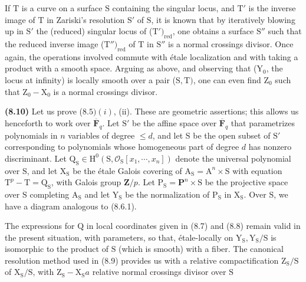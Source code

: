 \documentclass[10pt,leqno]{article}
\begin{document}
\clearpage

\label{physical-34}\par\smallskip

\noindent If \(\mathrm{T}\) is a curve on a surface \(\mathrm{S}\) containing the singular locus, and \(\mathrm{T}'\) is the inverse image of \(\mathrm{T}\) in Zariski’s resolution \(\mathrm{S}'\) of \(\mathrm{S}\), it is known that by iteratively blowing up in \(\mathrm{S}'\) the (reduced) singular locus of (\(\mathrm{T}')_{\mathrm{red}}\), one obtains a surface \(\mathrm{S}''\) such that the reduced inverse image (\(\mathrm{T}'')_{\mathrm{red}}\) of \(\mathrm{T}\) in \(\mathrm{S}''\) is a normal crossings divisor. Once again, the operations involved commute with étale localization and with taking a product with a smooth space. Arguing as above, and observing that (\(\mathrm{Y}_{0}\), the locus at infinity) is locally smooth over a pair (\(\mathrm{S},\mathrm{T})\), one can even find \(\mathrm{Z}_{0}\) such that \(\mathrm{Z}_{0}-\mathrm{X}_{0}\) is a normal crossings divisor.\par

\noindent \textbf{(8.10)} Let us prove (\(8.5) (i)\), (ii). These are geometric assertions; this allows us henceforth to work over \(\overline{\mathbf{F}}_{q}\). Let \(\mathrm{S}'\) be the affine space over \(\overline{\mathbf{F}}_{q}\) that parametrizes polynomials in \(n\) variables of degree \(\leq  d\), and let \(\mathrm{S}\) be the open subset of \(\mathrm{S}'\) corresponding to polynomials whose homogeneous part of degree \(d\) has nonzero discriminant. Let \(\mathrm{Q}_{\mathrm{S}} \in  \mathrm{H}^{0}(\mathrm{S},\mathcal{O}_{\mathrm{S}}[x_{1},\cdots ,x_{n}])\) denote the universal polynomial over \(\mathrm{S}\), and let \(\mathrm{X}_{\mathrm{S}}\) be the étale Galois covering of \(\mathrm{A}_{\mathrm{S}} = \mathrm{A}^{n} \times  \mathrm{S}\) with equation \(\mathrm{T}^{p}-\mathrm{T} = \mathrm{Q}_{\mathrm{S}}\), with Galois group \(\mathbf{Z}/p\). Let \(\mathrm{P}_{\mathrm{S}} = \mathbf{P}^{n} \times  \mathrm{S}\) be the projective space over \(\mathrm{S}\) completing \(\mathrm{A}_{\mathrm{S}}\) and let \(\mathrm{Y}_{\mathrm{S}}\) be the normalization of \(\mathrm{P}_{\mathrm{S}}\) in \(\mathrm{X}_{\mathrm{S}}\). Over \(\mathrm{S}\), we have a diagram analogous to (8.6.1).\par

\noindent The expressions for \(\mathrm{Q}\) in local coordinates given in (8.7) and (8.8) remain valid in the present situation, with parameters, so that, étale-locally on \(\mathrm{Y}_{\mathrm{S}}, \mathrm{Y}_{\mathrm{S}}/\mathrm{S}\) is isomorphic to the product of \(\mathrm{S}\) (which is smooth) with a fiber. The canonical resolution method used in (8.9) provides us with a relative compactification \(\mathrm{Z}_{\mathrm{S}}/\mathrm{S}\) of \(\mathrm{X}_{\mathrm{S}}/\mathrm{S}\), with \(\mathrm{Z}_{\mathrm{S}}-\mathrm{X}_{\mathrm{S}} a\) relative normal crossings divisor over \(\mathrm{S}\)\par
\end{document}
